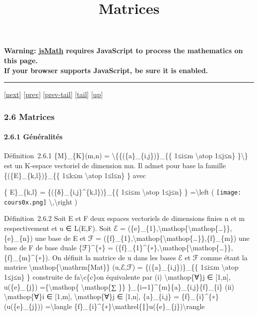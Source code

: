 \documentclass[]{article}
\title{Matrices}
\author{}
\date{}
\begin{document}
\maketitle

\textbf{Warning: \href{http://www.math.union.edu/locate/jsMath}{jsMath}
requires JavaScript to process the mathematics on this page.\\ If your
browser supports JavaScript, be sure it is enabled.}

\begin{center}\rule{3in}{0.4pt}\end{center}

{[}\href{coursse13.html}{next}{]} {[}\href{coursse11.html}{prev}{]}
{[}\href{coursse11.html\#tailcoursse11.html}{prev-tail}{]}
{[}\hyperref[tailcoursse12.html]{tail}{]}
{[}\href{coursch3.html\#coursse12.html}{up}{]}

\subsubsection{2.6 Matrices}

\paragraph{2.6.1 Généralités}

Définition~2.6.1 \{M\}\_\{K\}(m,n) =
\textbackslash{}\{\{(\{a\}\_\{i,j\})\}\_\{\{ 1≤i≤m \textbackslash{}atop
1≤j≤n\} \}\textbackslash{}\} est un K-espace vectoriel de dimension mn.
Il admet pour base la famille \{(\{E\}\_\{k,l\})\}\_\{\{ 1≤k≤m
\textbackslash{}atop 1≤l≤n\} \} avec

\{ E\}\_\{k,l\} = \{(\{δ\}\_\{i,j\}\^{}\{k,l\})\}\_\{\{ 1≤i≤m
\textbackslash{}atop 1≤j≤n\} \} =\textbackslash{}left (
\texttt{[image: cours0x.png]} \textbackslash{},\textbackslash{}right )

Définition~2.6.2 Soit E et F deux espaces vectoriels de dimensions
finies n et m respectivement et u ∈ L(E,F). Soit ℰ =
(\{e\}\_\{1\},\textbackslash{}mathop\{\textbackslash{}mathop\{\ldots{}\}\},\{e\}\_\{n\})
une base de E et ℱ =
(\{f\}\_\{1\},\textbackslash{}mathop\{\textbackslash{}mathop\{\ldots{}\}\},\{f\}\_\{m\})
une base de F de base duale \{ℱ\}\^{}\{∗\} =
(\{f\}\_\{1\}\^{}\{∗\},\textbackslash{}mathop\{\textbackslash{}mathop\{\ldots{}\}\},\{f\}\_\{m\}\^{}\{∗\}).
On définit la matrice de u dans les bases ℰ et ℱ comme étant la matrice
\textbackslash{}mathop\{\textbackslash{}mathrm\{Mat\}\} (u,ℰ,ℱ) =
\{(\{a\}\_\{i,j\})\}\_\{\{ 1≤i≤m \textbackslash{}atop 1≤j≤n\} \}
construite de fa\textbackslash{}c\{c\}on équivalente par (i)
\textbackslash{}mathop\{∀\}j ∈ {[}1,n{]}, u(\{e\}\_\{j\})
=\{\textbackslash{}mathop\{ \textbackslash{}mathop\{∑ \}\}
\}\_\{i=1\}\^{}\{m\}\{a\}\_\{i,j\}\{f\}\_\{i\} (ii)
\textbackslash{}mathop\{∀\}i ∈ {[}1,m{]}, \textbackslash{}mathop\{∀\}j ∈
{[}1,n{]}, \{a\}\_\{i,j\} = \{f\}\_\{i\}\^{}\{∗\}(u(\{e\}\_\{j\}))
=\textbackslash{}langle
\{f\}\_\{i\}\^{}\{∗\}\textbackslash{}mathrel\{∣\}u(\{e\}\_\{j\})\textbackslash{}rangle
\end{document}
